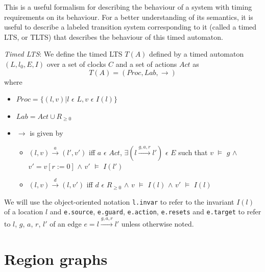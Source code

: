 \documentclass[a4paper]{llncs}
\begin{document}
This is a useful formalism for describing the behaviour of a system
with timing requirements on its behaviour. For a better understanding
of its semantics, it is useful to describe a labeled transition system
corresponding to it (called a timed LTS, or TLTS) that describes the
behaviour of this timed automaton.

\begin{definition}
  \emph{Timed LTS}: We define the timed LTS $T(A)$ defined by a timed
  automaton $(L, l_{0}, E, I)$ over a set of clocks $C$ and a set of
  actions $Act$ as 
  \begin{displaymath}
    T(A) = (Proc, Lab, \rightarrow)
  \end{displaymath}
  where
  \begin{itemize}
  \item $Proc = \{(l, v) | l$ $\epsilon$ $L, v$ $\epsilon$ $I(l)\}$
  \item $Lab = Act \cup R_{\ge 0}$
  \item $\rightarrow$ is given by
    \begin{itemize}
    \item $(l, v) \xrightarrow{a} (l', v')$ iff $a$ $\epsilon$ $Act$, $\exists (l
      \xrightarrow{g, a, r} l')$ $\epsilon$ $E$ such that $v$ $\models$
      $g$ $\wedge$ $v'=v[r:=0]$ $\wedge$ $v'$ $\models$ $I(l')$
    \item $(l, v) \xrightarrow{d} (l, v')$ iff $d$ $\epsilon$ $R_{\ge
      0}$ $\wedge$ $v$ $\models$ $I(l)$ $\wedge$ $v'$ $\models$ $I(l)$
    \end{itemize}
  \end{itemize}

\end{definition}

We will use the object-oriented notation \texttt{l.invar} to refer to
the invariant $I(l)$ of a location $l$ and \texttt{e.source}, \texttt{e.guard},
\texttt{e.action}, \texttt{e.resets} and \texttt{e.target} to refer to
$l$, $g$, $a$, $r$, $l'$ of
an edge $e = l \xrightarrow{g, a, r} l'$ unless otherwise noted.

\section{Region graphs}

\begin{figure}
  \centering
  \caption{Motivating examples for region graphs.}

  \begin{subfigure}[b]{0.6\textwidth}
    \centering
    \def\svgwidth{\columnwidth}
    
    \caption{}
    \label{regiongraph01}
  \end{subfigure}%
  ~%
  \begin{subfigure}[b]{0.2\textwidth}
    \centering
    \def\svgwidth{\columnwidth}
    
    \caption{}
    \label{regiongraph02}
  \end{subfigure}

\end{figure}
\end{document}
